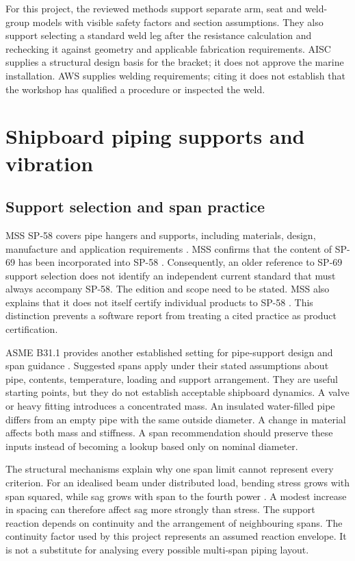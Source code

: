 For this project, the reviewed methods support separate arm, seat and weld-group models with visible safety factors and section assumptions. They also support selecting a standard weld leg after the resistance calculation and rechecking it against geometry and applicable fabrication requirements. AISC supplies a structural design basis for the bracket; it does not approve the marine installation. AWS supplies welding requirements; citing it does not establish that the workshop has qualified a procedure or inspected the weld.

\section{Shipboard piping supports and vibration}
\label{sec:lit-pipe-supports}

\subsection{Support selection and span practice}
\label{sec:lit-span-practice}

MSS SP-58 covers pipe hangers and supports, including materials, design, manufacture and application requirements \cite{mssSP58}. MSS confirms that the content of SP-69 has been incorporated into SP-58 \cite{mssSP69}. Consequently, an older reference to SP-69 support selection does not identify an independent current standard that must always accompany SP-58. The edition and scope need to be stated. MSS also explains that it does not itself certify individual products to SP-58 \cite{mssInterpretations}. This distinction prevents a software report from treating a cited practice as product certification.

ASME B31.1 provides another established setting for pipe-support design and span guidance \cite{asmeB311}. Suggested spans apply under their stated assumptions about pipe, contents, temperature, loading and support arrangement. They are useful starting points, but they do not establish acceptable shipboard dynamics. A valve or heavy fitting introduces a concentrated mass. An insulated water-filled pipe differs from an empty pipe with the same outside diameter. A change in material affects both mass and stiffness. A span recommendation should preserve these inputs instead of becoming a lookup based only on nominal diameter.

The structural mechanisms explain why one span limit cannot represent every criterion. For an idealised beam under distributed load, bending stress grows with span squared, while sag grows with span to the fourth power \cite{timoshenko1972}. A modest increase in spacing can therefore affect sag more strongly than stress. The support reaction depends on continuity and the arrangement of neighbouring spans. The continuity factor used by this project represents an assumed reaction envelope. It is not a substitute for analysing every possible multi-span piping layout.

